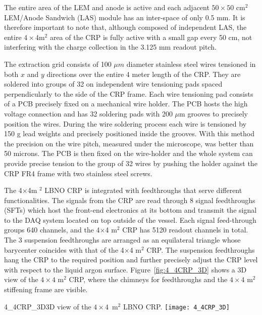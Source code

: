 The entire area of the LEM and anode is active and each adjacent $50\times50$ cm$^2$ LEM/Anode Sandwich (LAS) module has an inter-space of only 0.5 mm. It is therefore important  to note that, although composed of independent LAS, the  entire $4\times 4$m$^2$ area of the CRP is fully active with a small gap every 50 cm, not interfering with the charge collection in the 3.125 mm readout pitch.

The extraction grid consists of 100 $\mu$$m$ diameter stainless steel  wires tensioned in both $x$ and $y$ directions over the entire 4 meter  length of the CRP. They are soldered into groups of 32 on independent  wire tensioning pads spaced perpendicularly to the side of the CRP frame. Each wire  tensioning pad consists of a PCB precisely fixed on a mechanical wire  holder. The PCB hosts the high voltage connection and has 32 soldering pads with 200 $\mu$m grooves to precisely position the  wires. During the wire soldering process each wire is tensioned by 150 g lead weights and precisely positioned inside the grooves. With  this method the precision on the wire pitch, measured under the  microscope, was better than 50 microns. The PCB is then fixed on the  wire-holder and the whole system can provide precise tension to the  group of 32 wires by pushing the holder against the CRP FR4 frame  with two stainless steel screws.

The 4$\times$4m $^2$ LBNO CRP is integrated with feedthroughs that serve  different functionalities. The signals from the CRP are read  through 8 signal feedthroughs (SFTs) which host the front-end electronics at its bottom and transmit the signal to the DAQ system located on top outside of the vessel.  Each signal feed-through groups 640 channels, and the 4$\times$4 m$^2$ CRP has 5120 readout channels in total.  The 3 suspension feedthroughs are arranged as an equilateral triangle whose barycenter coincides with that of the 4$\times$4 m$^2$ CRP.  The suspension feedthroughs hang the CRP to   the required position and further precisely adjust the CRP level  with respect to the liquid argon surface. Figure~\ref{fig:4_4CRP_3D} shows a 3D view of the  $4\times4$ m$^2$ CRP, where the chimneys for feedthroughs and the  $4\times4$ m$^2$ stiffening frame are visible. 

\begin{cdrfigure}{4_4CRP_3D}{3D view of the $4\times4$~m$^2$ LBNO CRP.}
\texttt{[image: 4\_4CRP\_3D]}  
\end{cdrfigure}

